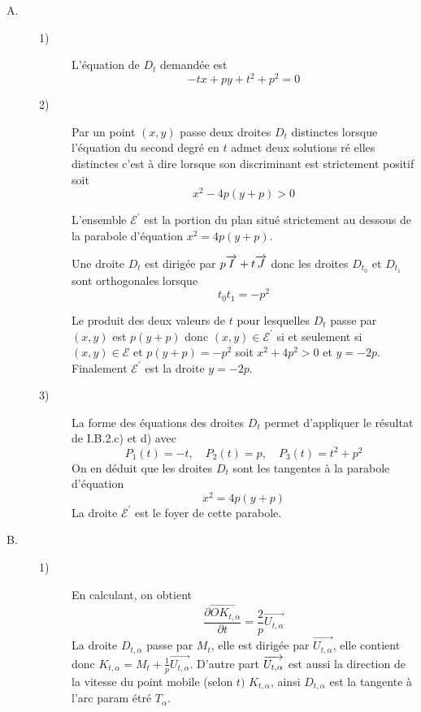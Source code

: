 \begin{description}
\item[A.] 
\begin{description}
\item[1)]  L'\'{e}quation de $D_{t}$ demand\'{e}e est 
\[
-tx+py+t^{2}+p^{2}=0
\]

\item[2)]  Par un point $(x,y)$ passe deux droites $D_{t}$ distinctes
lorsque l'\'{e}quation du second degr\'{e} en $t$ admet deux solutions r\'{e}%
elles distinctes c'est \`{a} dire lorsque son discriminant est strictement
positif soit 
\[
x^{2}-4p(y+p)>0
\]

L'ensemble $\mathcal{E}^{\prime }$ est la portion du plan situ\'{e}
strictement au dessous de la parabole d'\'{e}quation $x^{2}=4p(y+p)$.

Une droite $D_{t}$ est dirig\'{e}e par $p\overrightarrow{I}+t\overrightarrow{%
J}$ donc les droites $D_{t_{0}}$ et $D_{t_{1}}$ sont orthogonales lorsque 
\[
t_{0}t_{1}=-p^{2}
\]

Le produit des deux valeurs de $t$ pour lesquelles $D_{t}$ passe par $(x,y)$
est $p(y+p)$ donc $(x,y)\in \mathcal{E}^{\prime }$ si et seulement si $%
(x,y)\in \mathcal{E}$ et $p(y+p)=-p^{2}$ soit $x^{2}+4p^{2}>0$ et $y=-2p$.%
\newline
Finalement $\mathcal{E}^{\prime }$ est la droite $y=-2p$.

\item[3)]  La forme des \'{e}quations des droites $D_{t}$ permet d'appliquer
le r\'{e}sultat de I.B.2.c) et d) avec 
\[
P_{1}(t)=-t,\quad P_{2}(t)=p,\quad P_{3}(t)=t^{2}+p^{2}
\]
On en d\'{e}duit que les droites $D_{t}$ sont les tangentes \`{a} la
parabole d'\'{e}quation 
\[
x^{2}=4p(y+p)
\]
La droite $\mathcal{E}^{\prime }$ est le foyer de cette parabole.
\end{description}

\item[B.] 
\begin{description}
\item[1)]  En calculant, on obtient 
\[
\frac{\partial \overrightarrow{OK_{t,\alpha }}}{\partial t}=\frac{2}{p}%
\overrightarrow{U_{t,\alpha }}
\]
La droite $D_{t,\alpha }$ passe par $M_{t}$, elle est dirig\'{e}e par $%
\overrightarrow{U_{t,\alpha }}$, elle contient donc $K_{t,\alpha }=M_{t}+%
\frac{1}{p}\overrightarrow{U_{t,\alpha }}$. D'autre part $\overrightarrow{%
U_{t,\alpha }}$ est aussi la direction de la vitesse du point mobile (selon $%
t)$ $K_{t,\alpha }$, ainsi $D_{t,\alpha }$ est la tangente \`{a} l'arc param%
\'{e}tr\'{e} $T_{\alpha }$.


\end{description}
\end{description}
